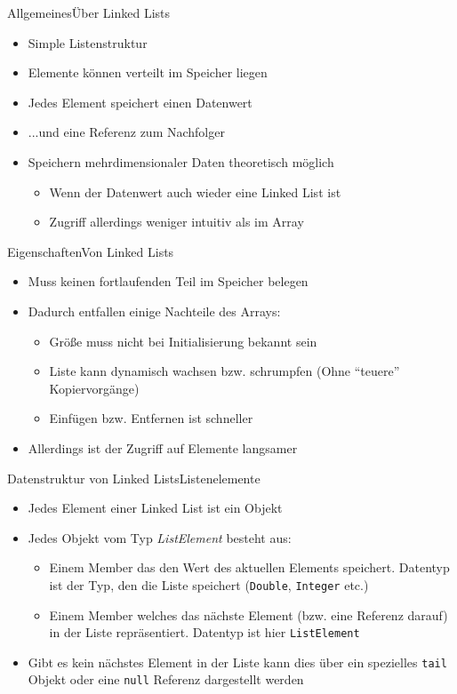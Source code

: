 \begin{frame}{Allgemeines}{Über Linked Lists}
	\begin{itemize}
		\item Simple Listenstruktur
		\item Elemente können verteilt im Speicher liegen
		\item Jedes Element speichert einen Datenwert
		\item ...und eine Referenz zum Nachfolger
		\item Speichern mehrdimensionaler Daten theoretisch möglich
		\begin{itemize}
			\item Wenn der Datenwert auch wieder eine Linked List ist
			\item Zugriff allerdings weniger intuitiv als im Array
		\end{itemize}
	\end{itemize}
\end{frame}


\begin{frame}{Eigenschaften}{Von Linked Lists}
	\begin{itemize}
		\item Muss keinen fortlaufenden Teil im Speicher belegen
		\item Dadurch entfallen einige Nachteile des Arrays:
		\begin{itemize}
			\item Größe muss nicht bei Initialisierung bekannt sein
			\item Liste kann dynamisch wachsen bzw. schrumpfen (Ohne "`teuere"' Kopiervorgänge)
			\item Einfügen bzw. Entfernen ist schneller
		\end{itemize}
		\item Allerdings ist der Zugriff auf Elemente langsamer
	\end{itemize}
\end{frame}

\begin{frame}{Datenstruktur von Linked Lists}{Listenelemente}
	\begin{itemize}
		\item Jedes Element einer Linked List ist ein Objekt
		\item Jedes Objekt vom Typ \textit{ListElement} besteht aus:
		\begin{itemize}
			\item Einem Member das den Wert des aktuellen Elements speichert. Datentyp ist der Typ, den die Liste speichert (\texttt{Double}, \texttt{Integer} etc.)
			\item Einem Member welches das nächste Element (bzw. eine Referenz darauf) in der Liste repräsentiert. Datentyp ist hier \texttt{ListElement}
		\end{itemize}
		\item Gibt es kein nächstes Element in der Liste kann dies über ein spezielles \texttt{tail} Objekt oder eine \texttt{null} Referenz dargestellt werden
	\end{itemize}
\end{frame}

